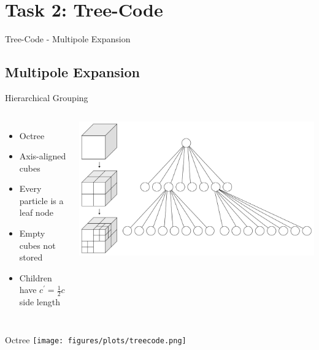 \section{Task 2: Tree-Code}
\begin{frame}[plain]
	\huge{Tree-Code - Multipole Expansion}
\end{frame}

\subsection{Multipole Expansion}
\begin{frame}{Hierarchical Grouping}
	\begin{columns}
		\begin{itemize}
			\item Octree
			\item Axis-aligned cubes
			\item Every particle is a leaf node
			\item Empty cubes not stored
			\item Children have $c^\prime = \frac{1}{2}c$ side length
		\end{itemize}
		\includegraphics[width=\linewidth]{figures/cube.png}
	\end{columns}
\end{frame}

\begin{frame}[plain]{Octree}
	\texttt{[image: figures/plots/treecode.png]}
\end{frame}

